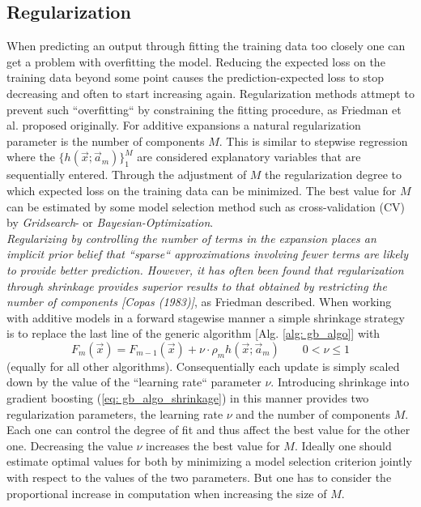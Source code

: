 \documentclass[12pt, a4paper]{article}
\begin{document}
\subsection{Regularization}
When predicting an output through fitting the training data too closely one can get a problem with overfitting the model. Reducing the expected loss on the training data beyond some point causes the prediction-expected loss to stop decreasing and often to start increasing again. 
Regularization methods attmept to prevent such ``overfitting`` by constraining the fitting procedure, as Friedman et al. \cite{Friedman2001} proposed originally.
For additive expansions a natural regularization parameter is the number of components $M$. This is similar to stepwise regression where the $\{h(\vec{x};\vec{a}_m)\}_1^M$ are considered explanatory variables that are sequentially entered. Through the adjustment of $M$ the regularization degree to which expected loss on the training data can be minimized. The best value for $M$ can be estimated by some model selection method such as cross-validation (CV) by \textit{Gridsearch}- or \textit{Bayesian-Optimization}. \\
\textit{Regularizing by controlling the number of terms in the expansion places an
implicit prior belief that ``sparse`` approximations involving fewer terms are
likely to provide better prediction. However, it has often been found that regularization through shrinkage provides superior results to that obtained by
restricting the number of components [Copas (1983)]}, as Friedman \cite{Friedman2001} described.
When working with additive models in a forward stagewise manner a simple shrinkage strategy is to replace the last line of the generic algorithm [Alg. \ref{alg: gb_algo}] with
\begin{equation}
    \label{eq: gb_algo_shrinkage}
    F_m(\vec{x}) = F_{m-1}(\vec{x}) + \nu \cdot \rho_{m} h(\vec{x};\vec{a}_m) \qquad 0 < \nu \leq 1
\end{equation}
(equally for all other algorithms). Consequentially each update is simply scaled down by the value of the ``learning rate`` parameter $\nu$.
Introducing shrinkage into gradient boosting (\ref{eq: gb_algo_shrinkage}) in this manner provides two regularization parameters, the learning rate $\nu$ and the number of components $M$. Each one can control the degree of fit and thus affect the best value for the other one. Decreasing the value $\nu$ increases the best value for $M$. Ideally one should estimate optimal values for both by minimizing a model selection criterion jointly with respect to the values of the two parameters. But one has to consider the proportional increase in computation when increasing the size of $M$.
\newpage
\end{document}
